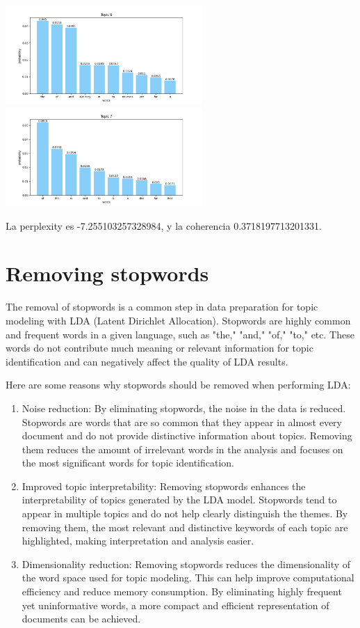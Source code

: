 \documentclass[10pt]{article} %
\begin{document}
\begin{center}
		\includegraphics[width=7.5cm]{images/plots/test_8/topic_6.png}
		\includegraphics[width=7.5cm]{images/plots/test_8/topic_7.png}
	\end{center}

	La perplexity es -7.255103257328984, y la coherencia  0.3718197713201331.
	
	
	\section{Removing stopwords}
	
	The removal of stopwords is a common step in data preparation for topic modeling with LDA (Latent Dirichlet Allocation). Stopwords are highly common and frequent words in a given language, such as "the," "and," "of," "to," etc. These words do not contribute much meaning or relevant information for topic identification and can negatively affect the quality of LDA results.
	
	Here are some reasons why stopwords should be removed when performing LDA:
	\begin{enumerate}
		\item Noise reduction: By eliminating stopwords, the noise in the data is reduced. Stopwords are words that are so common that they appear in almost every document and do not provide distinctive information about topics. Removing them reduces the amount of irrelevant words in the analysis and focuses on the most significant words for topic identification.
		
		\item 	Improved topic interpretability: Removing stopwords enhances the interpretability of topics generated by the LDA model. Stopwords tend to appear in multiple topics and do not help clearly distinguish the themes. By removing them, the most relevant and distinctive keywords of each topic are highlighted, making interpretation and analysis easier.
		
		\item Dimensionality reduction: Removing stopwords reduces the dimensionality of the word space used for topic modeling. This can help improve computational efficiency and reduce memory consumption. By eliminating highly frequent yet uninformative words, a more compact and efficient representation of documents can be achieved.
	\end{enumerate}
	
\end{document}
